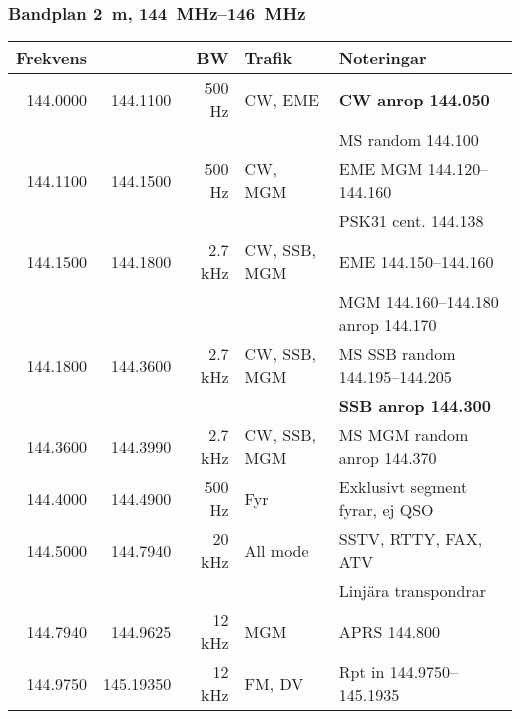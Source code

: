 \subsubsection{Bandplan \qty{2}{\metre}, \SIrange{144}{146}{\mega\hertz}}
\begin{tabular}{rrrll}
\textbf{Frekvens} &           & \textbf{BW} & \textbf{Trafik}
& \textbf{Noteringar}                                             \\ \hline

144.0000 & 144.1100  & 500 Hz  & CW, EME      & \textbf{CW anrop \num{144,050}}                                 \\
         &           &         &              & MS random \num{144,100}                                         \\ \hline
144.1100 & 144.1500  & 500 Hz  & CW, MGM      & EME MGM \numrange{144,120}{144,160}                             \\
         &           &         &              & PSK31 cent. \num{144,138}                                       \\ \hline
144.1500 & 144.1800  & 2.7 kHz & CW, SSB, MGM & EME \numrange{144,150}{144,160}                                 \\
         &           &         &              & MGM \numrange{144,160}{144,180} anrop \num{144,170}             \\ \hline
144.1800 & 144.3600  & 2.7 kHz & CW, SSB, MGM & MS SSB random \numrange{144,195}{144,205}                       \\
         &           &         &              & \textbf{SSB anrop \num{144,300}}                                \\ \hline
144.3600 & 144.3990  & 2.7 kHz & CW, SSB, MGM & MS MGM random anrop \num{144,370}                               \\ \hline
144.4000 & 144.4900  & 500 Hz  & Fyr          & Exklusivt segment fyrar, ej QSO                                 \\ \hline
144.5000 & 144.7940  & 20 kHz  & All mode     & SSTV, RTTY, FAX, ATV                                            \\
         &           &         &              & Linjära transpondrar                                            \\ \hline
144.7940 & 144.9625  & 12 kHz  & MGM          & APRS \num{144,800}                                              \\ \hline
144.9750 & 145.19350 & 12 kHz  & FM, DV       & Rpt in \numrange{144,9750}{145,1935}                            \\

\end{tabular}
